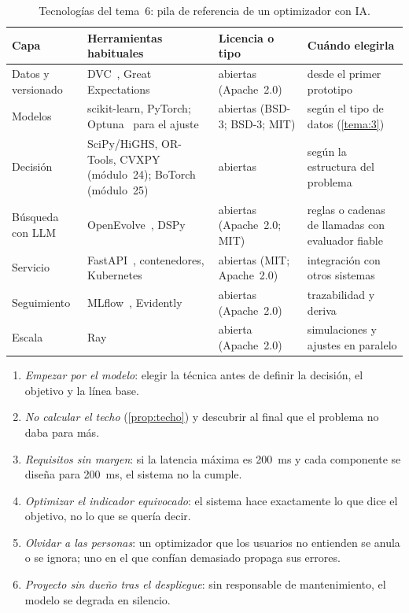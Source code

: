 \begin{table}[h]
\centering\small
\caption{Tecnologías del tema~6: pila de referencia de un optimizador con IA.}\label{tab:tec6}
\begin{tabularx}{\textwidth}{@{}>{\raggedright\arraybackslash}p{2.5cm}>{\raggedright\arraybackslash}X>{\raggedright\arraybackslash}p{2.1cm}>{\raggedright\arraybackslash}X@{}}
\toprule
Capa & Herramientas habituales & Licencia o tipo & Cuándo elegirla \\
\midrule
Datos y versionado & DVC~\cite{dvc}, Great Expectations & abiertas (Apache~2.0) & desde el primer prototipo \\
Modelos & scikit-learn, PyTorch; Optuna~\cite{optuna} para el ajuste & abiertas (BSD-3; BSD-3; MIT) & según el tipo de datos (\cref{tema:3}) \\
Decisión & SciPy/HiGHS, OR-Tools, CVXPY (módulo~24); BoTorch (módulo~25) & abiertas & según la estructura del problema \\
Búsqueda con LLM & OpenEvolve~\cite{openevolve}, DSPy~\cite{dspy} & abiertas (Apache~2.0; MIT) & reglas o cadenas de llamadas con evaluador fiable \\
Servicio & FastAPI~\cite{fastapi}, contenedores, Kubernetes~\cite{k8s} & abiertas (MIT; Apache~2.0) & integración con otros sistemas \\
Seguimiento & MLflow~\cite{mlflow}, Evidently~\cite{evidently} & abiertas (Apache~2.0) & trazabilidad y deriva \\
Escala & Ray~\cite{ray} & abierta (Apache~2.0) & simulaciones y ajustes en paralelo \\
\bottomrule
\end{tabularx}
\end{table}

\begin{observacion}\label{obs:errores6}
\begin{enumerate}[label=(\alph*)]
  \item \emph{Empezar por el modelo}: elegir la técnica antes de definir la decisión, el objetivo y la línea base.
  \item \emph{No calcular el techo} (\cref{prop:techo}) y descubrir al final que el problema no daba para más.
  \item \emph{Requisitos sin margen}: si la latencia máxima es 200~ms y cada componente se diseña para 200~ms, el sistema no la cumple.
  \item \emph{Optimizar el indicador equivocado}: el sistema hace exactamente lo que dice el objetivo, no lo que se quería decir.
  \item \emph{Olvidar a las personas}: un optimizador que los usuarios no entienden se anula o se ignora; uno en el que confían demasiado propaga sus errores.
  \item \emph{Proyecto sin dueño tras el despliegue}: sin responsable de mantenimiento, el modelo se degrada en silencio.
\end{enumerate}
\end{observacion}

